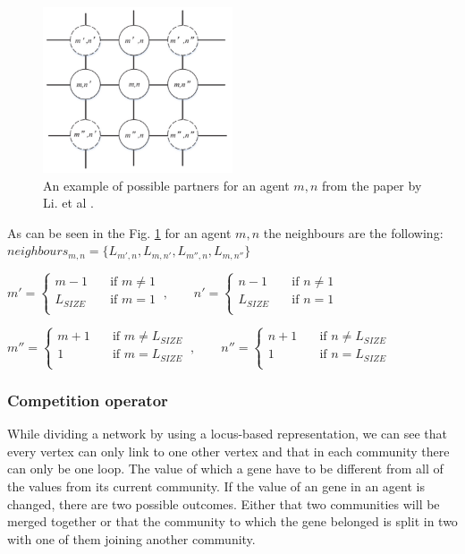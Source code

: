 \begin{figure}[H]
\begin{center}
\includegraphics[width=0.5\textwidth]{images/neighbours.png}
\caption{An example of possible partners for an agent $m,n$ from the paper by Li. et al \cite{Li2016}.}\label{fig:neighbours}
\end{center}
\end{figure}
\newpage
As can be seen in the Fig. \ref{fig:neighbours} for an agent $m,n$ the neighbours are the following:\\
$neighbours_{m,n} = \lbrace L_{m',n},L_{m,n'},L_{m'',n},L_{m,n''} \rbrace$
\begin{center}
$ m' =
  \begin{cases}
    m-1       & \quad \text{if } m \neq 1\\
    L_{SIZE}  & \quad \text{if } m = 1\\
  \end{cases}\:,\qquad
n' =
  \begin{cases}
    n-1       & \quad \text{if } n \neq 1\\
    L_{SIZE}  & \quad \text{if } n = 1\\
  \end{cases}
$

$ m'' =
  \begin{cases}
    m+1       & \quad \text{if } m \neq L_{SIZE}\\
    1  & \quad \text{if } m = L_{SIZE}\\
  \end{cases}\:,\qquad
n'' =
  \begin{cases}
    n+1       & \quad \text{if } n \neq L_{SIZE}\\
    1  & \quad \text{if } n = L_{SIZE}\\
  \end{cases}
$
\end{center}

\subsubsection{Competition operator}
While dividing a network by using a locus-based representation, we can see that every vertex can only link to one other vertex and that in each community there can only be one loop.
The value of which a gene have to be different from all of the values from its current community.
If the value of an gene in an agent is changed, there are two possible outcomes.
Either that two communities will be merged together or that the community to which the gene belonged is split in two with one of them joining another community.

